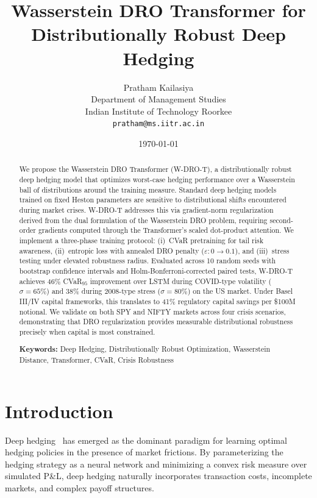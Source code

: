 \documentclass[11pt]{article}
\title{\textbf{Wasserstein DRO Transformer for Distributionally Robust Deep Hedging}}
\author{
Pratham Kailasiya \\
Department of Management Studies \\
Indian Institute of Technology Roorkee \\
\texttt{pratham@ms.iitr.ac.in}
}
\date{\today}
\begin{document}
\maketitle

\begin{abstract}
We propose the Wasserstein DRO Transformer (W-DRO-T), a distributionally robust deep hedging model that optimizes worst-case hedging performance over a Wasserstein ball of distributions around the training measure. Standard deep hedging models trained on fixed Heston parameters are sensitive to distributional shifts encountered during market crises. W-DRO-T addresses this via gradient-norm regularization derived from the dual formulation of the Wasserstein DRO problem, requiring second-order gradients computed through the Transformer's scaled dot-product attention. We implement a three-phase training protocol: (i)~CVaR pretraining for tail risk awareness, (ii)~entropic loss with annealed DRO penalty ($\varepsilon: 0 \to 0.1$), and (iii)~stress testing under elevated robustness radius. Evaluated across 10 random seeds with bootstrap confidence intervals and Holm-Bonferroni-corrected paired tests, W-DRO-T achieves 46\% CVaR$_{95}$ improvement over LSTM during COVID-type volatility ($\sigma = 65\%$) and 38\% during 2008-type stress ($\sigma = 80\%$) on the US market. Under Basel III/IV capital frameworks, this translates to 41\% regulatory capital savings per \$100M notional. We validate on both SPY and NIFTY markets across four crisis scenarios, demonstrating that DRO regularization provides measurable distributional robustness precisely when capital is most constrained.

\smallskip
\noindent\textbf{Keywords:} Deep Hedging, Distributionally Robust Optimization, Wasserstein Distance, Transformer, CVaR, Crisis Robustness
\end{abstract}

\section{Introduction}
\label{sec:intro}

Deep hedging~\citep{buehler2019deep} has emerged as the dominant paradigm for learning optimal hedging policies in the presence of market frictions. By parameterizing the hedging strategy as a neural network and minimizing a convex risk measure over simulated P\&L, deep hedging naturally incorporates transaction costs, incomplete markets, and complex payoff structures.
\end{document}
